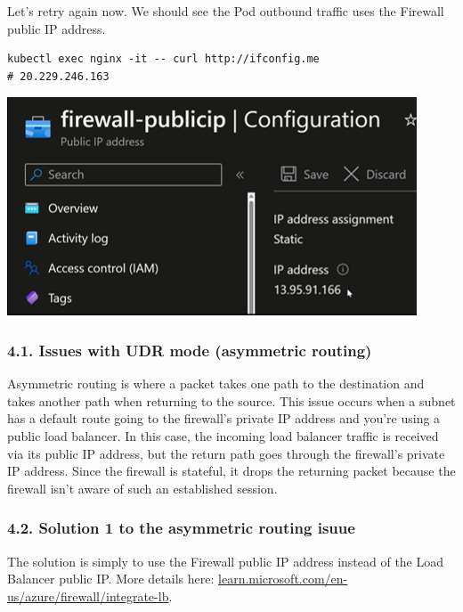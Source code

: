 \documentclass[
]{article}
\begin{document}
Let's retry again now. We should see the Pod outbound traffic uses the
Firewall public IP address.

\begin{lstlisting}
kubectl exec nginx -it -- curl http://ifconfig.me
# 20.229.246.163
\end{lstlisting}

\includegraphics{images/65_aks_egress_lb_natgw_udr__udr-firewall-pip.png}

\hypertarget{issues-with-udr-mode-asymmetric-routing}{%
\subsubsection{4.1. Issues with UDR mode (asymmetric
routing)}\label{issues-with-udr-mode-asymmetric-routing}}

Asymmetric routing is where a packet takes one path to the destination
and takes another path when returning to the source. This issue occurs
when a subnet has a default route going to the firewall's private IP
address and you're using a public load balancer. In this case, the
incoming load balancer traffic is received via its public IP address,
but the return path goes through the firewall's private IP address.
Since the firewall is stateful, it drops the returning packet because
the firewall isn't aware of such an established session.

\hypertarget{solution-1-to-the-asymmetric-routing-isuue}{%
\subsubsection{4.2. Solution 1 to the asymmetric routing
isuue}\label{solution-1-to-the-asymmetric-routing-isuue}}

The solution is simply to use the Firewall public IP address instead of
the Load Balancer public IP. More details here:
\href{https://learn.microsoft.com/en-us/azure/firewall/integrate-lb}{learn.microsoft.com/en-us/azure/firewall/integrate-lb}.
\end{document}
